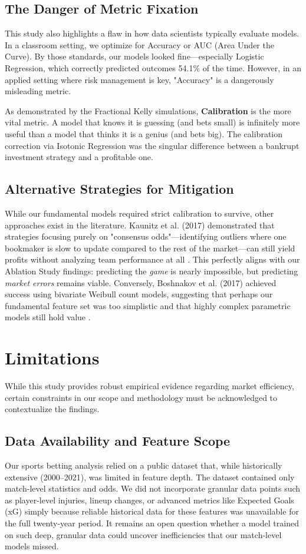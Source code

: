 \documentclass[pdflatex,sn-basic]{sn-jnl}
\begin{document}
\subsection{The Danger of Metric Fixation}
This study also highlights a flaw in how data scientists typically evaluate models. In a classroom setting, we optimize for Accuracy or AUC (Area Under the Curve). By those standards, our models looked fine—especially Logistic Regression, which correctly predicted outcomes 54.1\% of the time. However, in an applied setting where risk management is key, "Accuracy" is a dangerously misleading metric. 

As demonstrated by the Fractional Kelly simulations, \textbf{Calibration} is the more vital metric. A model that knows it is guessing (and bets small) is infinitely more useful than a model that thinks it is a genius (and bets big). The calibration correction via Isotonic Regression was the singular difference between a bankrupt investment strategy and a profitable one.

\subsection{Alternative Strategies for Mitigation}
While our fundamental models required strict calibration to survive, other approaches exist in the literature. Kaunitz et al. (2017) demonstrated that strategies focusing purely on "consensus odds"—identifying outliers where one bookmaker is slow to update compared to the rest of the market—can still yield profits without analyzing team performance at all \cite{kaunitz2017}. This perfectly aligns with our Ablation Study findings: predicting the \textit{game} is nearly impossible, but predicting \textit{market errors} remains viable. Conversely, Boshnakov et al. (2017) achieved success using bivariate Weibull count models, suggesting that perhaps our fundamental feature set was too simplistic and that highly complex parametric models still hold value \cite{boshnakov2017}.

\section{Limitations}

While this study provides robust empirical evidence regarding market efficiency, certain constraints in our scope and methodology must be acknowledged to contextualize the findings.

\subsection{Data Availability and Feature Scope}
Our sports betting analysis relied on a public dataset that, while historically extensive (2000–2021), was limited in feature depth. The dataset contained only match-level statistics and odds. We did not incorporate granular data points such as player-level injuries, lineup changes, or advanced metrics like Expected Goals (xG) simply because reliable historical data for these features was unavailable for the full twenty-year period. It remains an open question whether a model trained on such deep, granular data could uncover inefficiencies that our match-level models missed.
\end{document}

